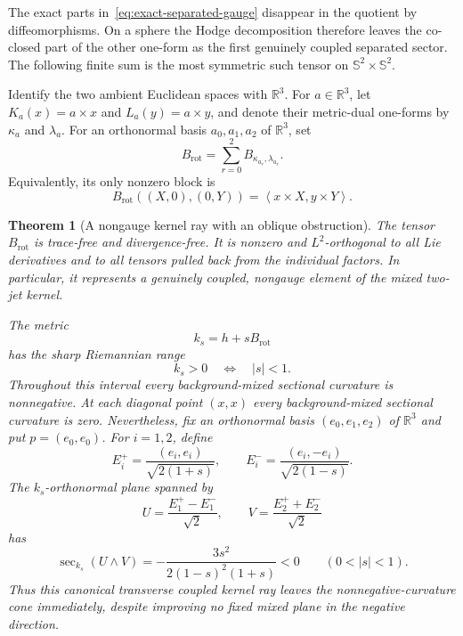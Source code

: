 \documentclass[11pt]{amsart}
\newtheorem{theorem}{Theorem}[section]
\theoremstyle{definition}
\theoremstyle{remark}
\DeclareMathOperator{\secop}{sec}
\newcommand{\R}{\mathbb R}
\newcommand{\Sph}{\mathbb S}
\newcommand{\ip}[2]{\left\langle #1,#2\right\rangle}
\begin{document}
The exact parts in~\eqref{eq:exact-separated-gauge} disappear in the
quotient by diffeomorphisms.  On a sphere the Hodge decomposition
therefore leaves the co-closed part of the other one-form as the first
genuinely coupled separated sector.  The following finite sum is the
most symmetric such tensor on $\Sph^2\times\Sph^2$.

Identify the two ambient Euclidean spaces with $\R^3$.  For
$a\in\R^3$, let $K_a(x)=a\times x$ and $L_a(y)=a\times y$, and denote
their metric-dual one-forms by $\kappa_a$ and $\lambda_a$.  For an
orthonormal basis $a_0,a_1,a_2$ of $\R^3$, set
\begin{equation}\label{eq:rotational-kernel}
 B_{\mathrm{rot}}=\sum_{r=0}^2B_{\kappa_{a_r},\lambda_{a_r}}.
\end{equation}
Equivalently, its only nonzero block is
\begin{equation}\label{eq:rotational-kernel-intrinsic}
 B_{\mathrm{rot}}((X,0),(0,Y))
 =\ip{x\times X}{y\times Y}.
\end{equation}

\begin{theorem}[A nongauge kernel ray with an oblique obstruction]
\label{thm:rotational-kernel}
The tensor $B_{\mathrm{rot}}$ is trace-free and divergence-free.  It is
nonzero and $L^2$-orthogonal to all Lie derivatives and to all tensors
pulled back from the individual factors.  In particular, it represents
a genuinely coupled, nongauge element of the mixed two-jet kernel.

The metric
\[
 k_s=h+sB_{\mathrm{rot}}
\]
has the sharp Riemannian range
\[
 k_s>0\quad\Longleftrightarrow\quad |s|<1.
\]
Throughout this interval every
background-mixed sectional curvature is nonnegative.  At each diagonal
point $(x,x)$ every background-mixed sectional curvature is zero.
Nevertheless, fix an orthonormal basis $(e_0,e_1,e_2)$ of $\R^3$ and
put $p=(e_0,e_0)$.  For $i=1,2$, define
\[
 E_i^+=\frac{(e_i,e_i)}{\sqrt{2(1+s)}},
 \qquad
 E_i^-=\frac{(e_i,-e_i)}{\sqrt{2(1-s)}}.
\]
The $k_s$-orthonormal plane spanned by
\begin{equation}\label{eq:rotational-oblique-plane}
 U=\frac{E_1^+-E_1^-}{\sqrt2},
 \qquad
 V=\frac{E_2^++E_2^-}{\sqrt2}
\end{equation}
has
\begin{equation}\label{eq:rotational-oblique-curvature}
 \secop_{k_s}(U\wedge V)
 =-\frac{3s^2}{2(1-s)^2(1+s)}<0
 \qquad(0<|s|<1).
\end{equation}
Thus this canonical transverse coupled kernel ray leaves the
nonnegative-curvature cone immediately, despite improving no fixed
mixed plane in the negative direction.
\end{theorem}
\end{document}

